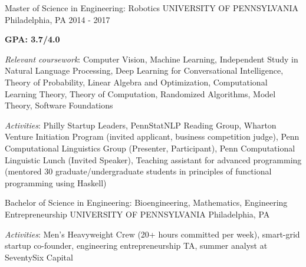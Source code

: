 \begin{cventries}
  \cventry
    {Master of Science in Engineering: Robotics}
    {UNIVERSITY OF PENNSYLVANIA}
    {Philadelphia, PA}
    {2014 - 2017}
    {
      \begin{cvitems}
        \item \textbf{GPA: 3.7/4.0}
        \item \textit{Relevant coursework}: Computer Vision, Machine Learning, Independent Study in Natural Language Processing, Deep Learning for Conversational Intelligence, Theory of Probability, Linear Algebra and Optimization, Computational Learning Theory, Theory of Computation, Randomized Algorithms, Model Theory, Software Foundations
        \item \textit{Activities}: Philly Startup Leaders, PennStatNLP Reading Group, Wharton Venture Initiation Program (invited applicant, business competition judge), Penn Computational Linguistics Group (Presenter, Participant),  Penn Computational Linguistic Lunch (Invited Speaker), Teaching assistant for advanced programming (mentored 30 graduate/undergraduate students in principles of functional programming using Haskell)
      \end{cvitems}
    }
  \cventry
    {Bachelor of Science in Engineering: Bioengineering, Mathematics, Engineering Entrepreneurship}
    {UNIVERSITY OF PENNSYLVANIA}
    {Philadelphia, PA}
    {}
    {
      \begin{cvitems}
        \item \textit{Activities}: Men’s Heavyweight Crew (20+ hours committed per week), smart-grid startup co-founder, engineering entrepreneurship TA, summer analyst at SeventySix Capital
      \end{cvitems}
    }
\end{cventries}
